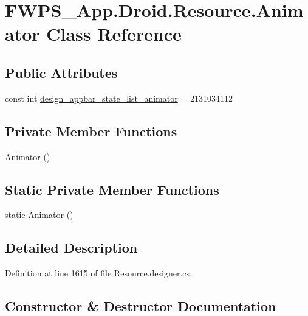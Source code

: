 \hypertarget{class_f_w_p_s___app_1_1_droid_1_1_resource_1_1_animator}{}\section{F\+W\+P\+S\+\_\+\+App.\+Droid.\+Resource.\+Animator Class Reference}
\label{class_f_w_p_s___app_1_1_droid_1_1_resource_1_1_animator}
\subsection*{Public Attributes}
\begin{DoxyCompactItemize}
\item 
const int \mbox{\hyperlink{class_f_w_p_s___app_1_1_droid_1_1_resource_1_1_animator_af90488a840f3140067fe3740c151c84f}{design\+\_\+appbar\+\_\+state\+\_\+list\+\_\+animator}} = 2131034112
\end{DoxyCompactItemize}
\subsection*{Private Member Functions}
\begin{DoxyCompactItemize}
\item 
\mbox{\hyperlink{class_f_w_p_s___app_1_1_droid_1_1_resource_1_1_animator_a49b27df8e43654290d111711faaa1e36}{Animator}} ()
\end{DoxyCompactItemize}
\subsection*{Static Private Member Functions}
\begin{DoxyCompactItemize}
\item 
static \mbox{\hyperlink{class_f_w_p_s___app_1_1_droid_1_1_resource_1_1_animator_a44a578338b2bced6853f5244b897eaf1}{Animator}} ()
\end{DoxyCompactItemize}


\subsection{Detailed Description}


Definition at line 1615 of file Resource.\+designer.\+cs.



\subsection{Constructor \& Destructor Documentation}
\mbox{\label{class_f_w_p_s___app_1_1_droid_1_1_resource_1_1_animator_a44a578338b2bced6853f5244b897eaf1}} 
